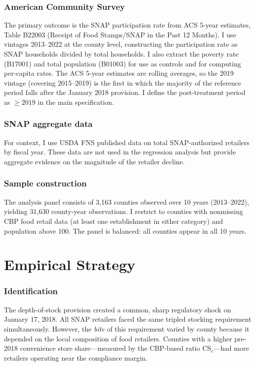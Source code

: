 \documentclass[12pt]{article}
\begin{document}
\subsubsection*{American Community Survey} The primary outcome is the SNAP participation rate from ACS 5-year estimates, Table B22003 (Receipt of Food Stamps/SNAP in the Past 12 Months). I use vintages 2013--2022 at the county level, constructing the participation rate as SNAP households divided by total households. I also extract the poverty rate (B17001) and total population (B01003) for use as controls and for computing per-capita rates. The ACS 5-year estimates are rolling averages, so the 2019 vintage (covering 2015--2019) is the first in which the majority of the reference period falls after the January 2018 provision. I define the post-treatment period as $\geq 2019$ in the main specification.

\subsubsection*{SNAP aggregate data} For context, I use USDA FNS published data on total SNAP-authorized retailers by fiscal year. These data are not used in the regression analysis but provide aggregate evidence on the magnitude of the retailer decline.

\subsubsection*{Sample construction} The analysis panel consists of 3,163 counties observed over 10 years (2013--2022), yielding 31,630 county-year observations. I restrict to counties with nonmissing CBP food retail data (at least one establishment in either category) and population above 100. The panel is balanced: all counties appear in all 10 years.




\section{Empirical Strategy}
\label{sec:strategy}

\subsubsection*{Identification} The depth-of-stock provision created a common, sharp regulatory shock on January 17, 2018. All SNAP retailers faced the same tripled stocking requirement simultaneously. However, the \textit{bite} of this requirement varied by county because it depended on the local composition of food retailers. Counties with a higher pre-2018 convenience store share---measured by the CBP-based ratio $\text{CS}_{c}$---had more retailers operating near the compliance margin.
\end{document}
